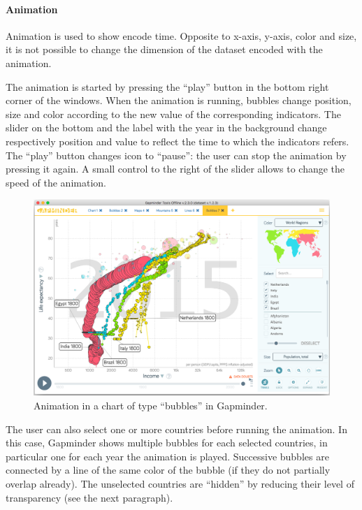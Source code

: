 \paragraph{Animation}
Animation is used to show encode time.
Opposite to x-axis, y-axis, color and size, it is not possible to change the dimension of the dataset encoded with the animation.

The animation is started by pressing the ``play'' button in the bottom right corner of the windows.
When the animation is running, bubbles change position, size and color according to the new value of the corresponding indicators.
The slider on the bottom and the label with the year in the background change respectively position and value to reflect the time to which the indicators refers.
The ``play'' button changes icon to ``pause'': the user can stop the animation by pressing it again.
A small control to the right of the slider allows to change the speed of the animation.

\begin{figure}[h]
	\centering
	\includegraphics[width=0.95\columnwidth]{figures/bubbles-animation}
	\caption{Animation in a chart of type ``bubbles'' in Gapminder.}
	\label{fig:bubbles-animation}
\end{figure}

The user can also select one or more countries before running the animation.
In this case, Gapminder shows multiple bubbles for each selected countries, in particular one for each year the animation is played.
Successive bubbles are connected by a line of the same color of the bubble (if they do not partially overlap already).
The unselected countries are ``hidden'' by reducing their level of transparency (see the next paragraph).

